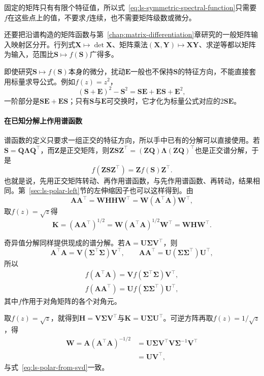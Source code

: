 固定的矩阵只有有限个特征值，所以式~\eqref{eq:ls-symmetric-spectral-function}只需要$f$在这些点上的值，不要求$f$连续，也不需要矩阵级数或微分。

还要把沿谱构造的矩阵函数与第~\ref{chap:matrix-differentiation}章研究的一般矩阵输入映射区分开。行列式$\bm X\mapsto\det\bm X$、矩阵乘法$(\bm X,\bm Y)\mapsto\bm X\bm Y$、求逆等都以矩阵为输入，范围比$\bm S\mapsto f(\bm S)$广得多。

即使研究$\bm S\mapsto f(\bm S)$本身的微分，扰动$\bm E$一般也不保持$\bm S$的特征方向，不能直接套用标量求导公式。例如$f(z)=z^2$，
\[
 (\bm S+\bm E)^2-\bm S^2=\bm S\bm E+\bm E\bm S+\bm E^2 ,
\]
一阶部分是$\bm S\bm E+\bm E\bm S$；只有$\bm S$与$\bm E$可交换时，它才化为标量公式对应的$2\bm S\bm E$。

\paragraph{在已知分解上作用谱函数}

谱函数的定义只要求一组正交的特征方向，所以手中已有的分解可以直接使用。若$\bm S=\bm Q\bm\Lambda\bm Q^\top$，而$\bm Z$是正交矩阵，则$\bm Z\bm S\bm Z^\top=(\bm Z\bm Q)\bm\Lambda(\bm Z\bm Q)^\top$也是正交谱分解，于是
\[
 f(\bm Z\bm S\bm Z^\top)=\bm Z f(\bm S)\bm Z^\top .
\]
也就是说，先用正交矩阵转动、再作用谱函数，与先作用谱函数、再转动，结果相同。第~\ref{sec:ls-polar-left}节的左伸缩因子也可以这样得到。由
\[
 \bm A\bm A^\top=\bm W\bm H\bm H\bm W^\top=\bm W(\bm A^\top\bm A)\bm W^\top ,
\]
取$f(z)=\sqrt z$得
\[
 \bm K=(\bm A\bm A^\top)^{1/2}=\bm W(\bm A^\top\bm A)^{1/2}\bm W^\top=\bm W\bm H\bm W^\top .
\]

奇异值分解同样提供现成的谱分解。若$\bm A=\bm U\bm\Sigma\bm V^\top$，则
\[
 \bm A^\top\bm A=\bm V(\bm\Sigma^\top\bm\Sigma)\bm V^\top,\qquad\bm A\bm A^\top=\bm U(\bm\Sigma\bm\Sigma^\top)\bm U^\top ,
\]
所以
\[
 \begin{gathered}
 f(\bm A^\top\bm A)=\bm V f(\bm\Sigma^\top\bm\Sigma)\bm V^\top ,\\
 f(\bm A\bm A^\top)=\bm U f(\bm\Sigma\bm\Sigma^\top)\bm U^\top ,
 \end{gathered}
\]
其中$f$作用于对角矩阵的各个对角元。

取$f(z)=\sqrt z$，就得到$\bm H=\bm V\bm\Sigma\bm V^\top$与$\bm K=\bm U\bm\Sigma\bm U^\top$。可逆方阵再取$f(z)=1/\sqrt z$，得
\[
 \begin{aligned}
 \bm W=\bm A(\bm A^\top\bm A)^{-1/2}
 &=\bm U\bm\Sigma\bm V^\top\bm V\bm\Sigma^{-1}\bm V^\top\\
 &=\bm U\bm V^\top ,
 \end{aligned}
\]
与式~\eqref{eq:ls-polar-from-svd}一致。

